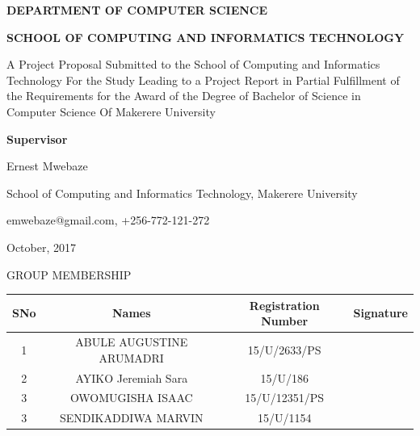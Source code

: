 \documentclass[12pt]{article}
\begin{document}
	\begin{center} \begin{Large} \textbf {DEPARTMENT OF COMPUTER SCIENCE} \end{Large}  \end{center}
	\begin{center} \begin{Large} \textbf {SCHOOL OF COMPUTING AND INFORMATICS TECHNOLOGY\\[1in]} \end{Large}  \end{center}
	\begin{center}A Project Proposal Submitted to the School of Computing and Informatics Technology
For the Study Leading to a Project Report in Partial Fulfillment of the
Requirements for the Award of the Degree of Bachelor of Science in Computer Science
Of Makerere University  \end{center}
\begin{center} \begin{large} \textbf { Supervisor} \end{large}  \end{center}
\begin{center} \begin{large} Ernest Mwebaze \end{large}  \end{center}	
\begin{center} \begin{large} School of Computing and Informatics Technology, Makerere University \end{large}  \end{center}
\begin{center} \begin{large} emwebaze@gmail.com, +256-772-121-272 \end{large}  \end{center}
\begin{center} \begin{large}October, 2017 \end{large}  \end{center}
\newpage
\begin{center}\begin{Large}GROUP MEMBERSHIP \end{Large} \end{center}

\begin{tabular} {|c|c|c|c|}
\hline
SNo & Names & Registration  Number & Signature \\ \hline
1 & ABULE AUGUSTINE ARUMADRI &  15/U/2633/PS &  \\ \hline
2 & AYIKO Jeremiah Sara &  15/U/186 & \\ \hline
3 & OWOMUGISHA ISAAC &  15/U/12351/PS & \\ \hline
3 & SENDIKADDIWA MARVIN &  15/U/1154 & \\ \hline
\end{tabular}
\newpage
\tableofcontents
\newpage
\end{document}
